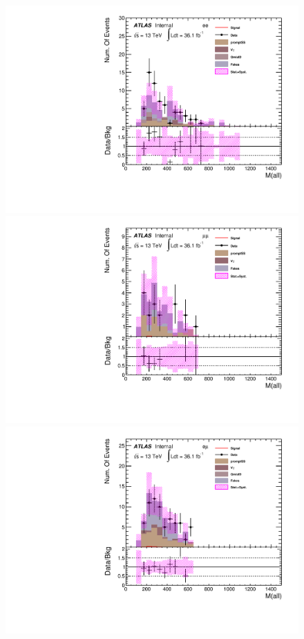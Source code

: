 \begin{figure}[h]
\begin{minipage}[t]{0.33\linewidth}
 \centering
 \includegraphics[width=1.0\textwidth,angle=-90]{fig/SigOpt/mH260_m_all_ee.pdf}
 \end{minipage}
 \begin{minipage}[t]{0.33\linewidth}
 \centering
 \includegraphics[width=1.0\textwidth,angle=-90]{fig/SigOpt/mH260_m_all_mumu.pdf}
 \end{minipage}
 \begin{minipage}[t]{0.33\linewidth}
 \centering
 \includegraphics[width=1.0\textwidth,angle=-90]{fig/SigOpt/mH260_m_all_emu.pdf}

\end{minipage}
\end{figure}
